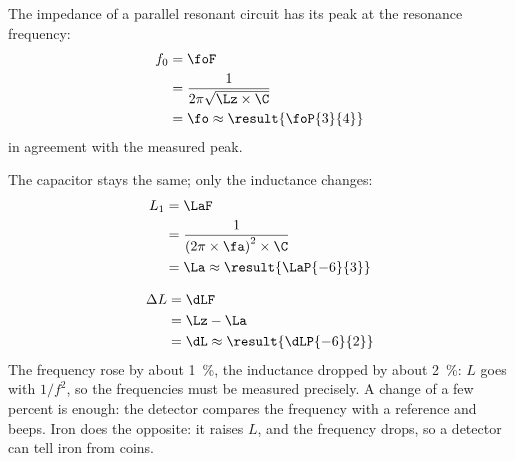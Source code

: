 \begin{abcliste}
\abc The impedance of a parallel resonant circuit has its peak at the resonance frequency:
\begin{align}
 f_0 &= \foF \\
   &= \frac{1}{2\pi\sqrt{\Lz\times\C}} \\
   &= \fo \approx \result{\foP{3}{4}}
\end{align}
in agreement with the measured peak.

\abc The capacitor stays the same; only the inductance changes:
\begin{align}
 L_1 &= \LaF \\
   &= \frac{1}{\left(2\pi\times\fa\right)^2\times\C} \\
   &= \La \approx \result{\LaP{-6}{3}}
\end{align}

\abc
\begin{align}
 \Delta L &= \dLF \\
   &= \Lz - \La \\
   &= \dL \approx \result{\dLP{-6}{2}}
\end{align}
The frequency rose by about \SI{1}{\percent}, the inductance dropped by about \SI{2}{\percent}: $L$ goes with $1/f^2$, so the frequencies must be measured precisely. A change of a few percent is enough: the detector compares the frequency with a reference and beeps. Iron does the opposite: it raises $L$, and the frequency drops, so a detector can tell iron from coins.
\end{abcliste}
